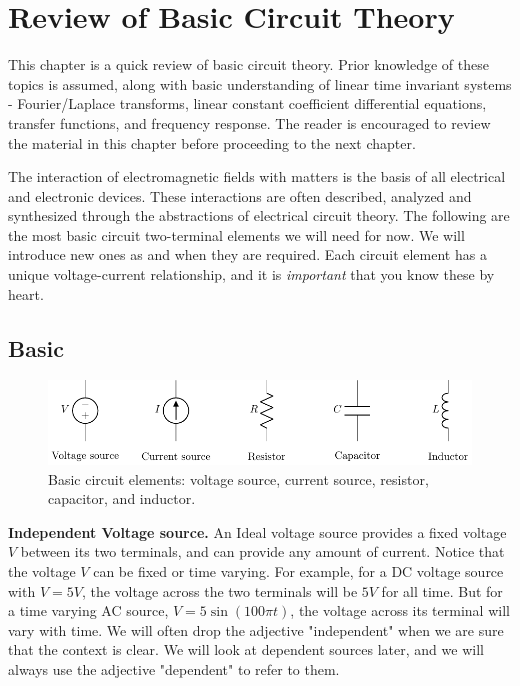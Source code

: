 \chapter{Review of Basic Circuit Theory}\label{chp:circuit_theory}

This chapter is a quick review of basic circuit theory. Prior knowledge of these topics is assumed, along with basic understanding of linear time invariant systems - Fourier/Laplace transforms, linear constant coefficient differential equations, transfer functions, and frequency response. The reader is encouraged to review the material in this chapter before proceeding to the next chapter.

The interaction of electromagnetic fields with matters is the basis of all electrical and electronic devices. These interactions are often described, analyzed and synthesized through the abstractions of electrical circuit theory. The following are the most basic circuit two-terminal elements we will need for now. We will introduce new ones as and when they are required. Each circuit element has a unique voltage-current relationship, and it is \emph{important} that you know these by heart.

\section{Basic}
\begin{figure}[b]
    \centering
    \includegraphics[width=\textwidth]{figure/ch02/fig02-01.pdf}
    \caption{Basic circuit elements: voltage source, current source, resistor, capacitor, and inductor.}
    \label{fig:02-01}
\end{figure}

\noindent\textbf{Independent Voltage source.} An Ideal voltage source provides a fixed voltage $V$ between its two terminals, and can provide any amount of current. Notice that the voltage $V$ can be fixed or time varying. For example, for a DC voltage source with $V = 5V$, the voltage across the two terminals will be $5V$ for all time. But for a time varying AC source, $V = 5 \sin \left( 100\pi t \right)$, the voltage across its terminal will vary with time. We will often drop the adjective "independent" when we are sure that the context is clear. We will look at dependent sources later, and we will always use the adjective "dependent" to refer to them.

